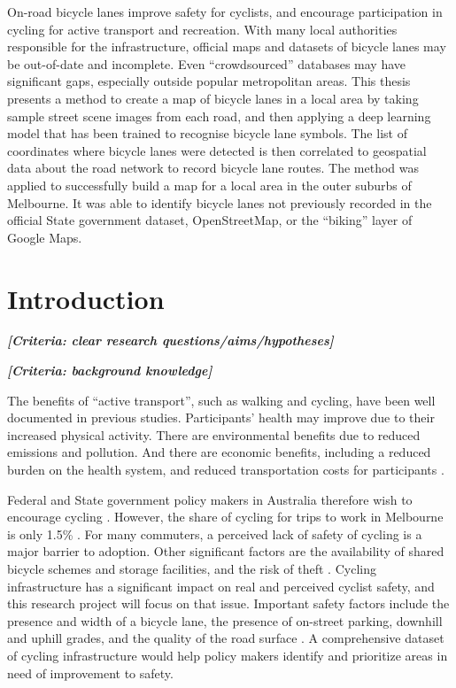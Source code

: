 \documentclass[11pt,twoside]{report}
\newcommand{\remark}[1]{{\bf \em [\marginpar{$\Leftarrow$}#1]}}
\begin{document}
On-road bicycle lanes improve safety for cyclists, and encourage participation in cycling for active transport and recreation.  With many local authorities responsible for the infrastructure, official maps and datasets of bicycle lanes may be out-of-date and incomplete.  Even ``crowdsourced'' databases may have significant gaps, especially outside popular metropolitan areas.  This thesis presents a method to create a map of bicycle lanes in a local area by taking sample street scene images from each road,  and then applying a deep learning model that has been trained to recognise bicycle lane symbols.  The list of coordinates where bicycle  lanes were detected is then correlated to geospatial data about the road network to record bicycle lane routes.  The method was applied to successfully build a map for a local area in the outer suburbs of Melbourne.  It was able to identify bicycle lanes not previously recorded in the official State government dataset, OpenStreetMap, or the ``biking'' layer of Google Maps.


\tableofcontents
\listoffigures
\listoftables


\chapter{Introduction}

\remark{Criteria: clear research questions/aims/hypotheses}

\remark{Criteria: background knowledge}

The benefits of ``active transport'', such as walking and cycling, have been well documented in previous studies.  Participants' health may improve due to their increased physical activity.  There are environmental benefits due to reduced emissions and pollution.  And there are economic benefits, including a reduced burden on the health system, and reduced transportation costs for participants \cite{LEE2012219} \cite{RABL2012121}.

Federal and State government policy makers in Australia therefore wish to encourage cycling \cite{federal_policy_2019} \cite{state_policy_2020}.  However, the share of cycling for trips to work in Melbourne is only 1.5\% \cite{melbactive}.  For many commuters, a perceived lack of safety of cycling is a major barrier to adoption.  Other significant factors are the availability of shared bicycle schemes and storage facilities, and the risk of theft \cite{WILSON2018234}.  Cycling infrastructure has a significant impact on real and perceived cyclist safety, and this research project will focus on that issue.  Important safety factors include the presence and width of a bicycle lane, the presence of on-street parking, downhill and uphill grades, and the quality of the road surface \cite{BIKESAFETY} \cite{Teschke2012}.  A comprehensive dataset of cycling infrastructure would help policy makers identify and prioritize areas in need of improvement to safety.
\end{document}
